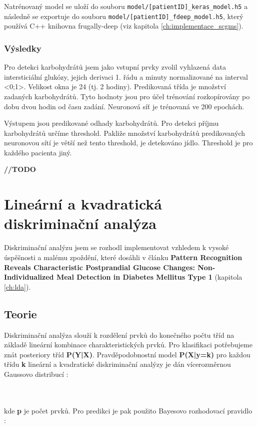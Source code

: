Natrénovaný model se uloží do souboru \texttt{model/[patientID]\_keras\_model.h5} a následně se exportuje do souboru \texttt{model/[patientID]\_fdeep\_model.h5}, který používá C++ knihovna frugally-deep (viz kapitola \ref{ch:implementace_scgms}).

\subsubsection{Výsledky}

Pro detekci karbohydrátů jsem jako vstupní prvky zvolil vyhlazená data intersticiální glukózy, jejich derivaci 1. řádu a minuty normalizované na interval <0;1>. Velikost okna je 24 (tj. 2 hodiny). Predikovaná třída je množství zadaných karbohydrátů. Tyto hodnoty jsou pro účel trénování rozkopírovány po dobu dvou hodin od času zadání. Neuronová síť je trénovaná ve 200 epochách.

Výstupem jsou predikované odhady karbohydrátů. Pro detekci příjmu karbohydrátů určíme threshold. Pakliže množství karbohydrátů predikovaných neuronovou sítí je větší než tento threshold, je detekováno jídlo. Threshold je pro každého pacienta jiný.

\textbf{//TODO}

\section{Lineární a kvadratická diskriminační analýza}
\label{ch:lda_qda}

Diskriminační analýzu jsem se rozhodl implementovat vzhledem k vysoké úspěšnosti a malému zpoždění, které dosáhli \citet{Analyza.LDA} v článku \textbf{Pattern Recognition Reveals Characteristic Postprandial Glucose Changes: Non-Individualized Meal Detection in Diabetes Mellitus Type 1} (kapitola \ref{ch:lda}).

\subsection{Teorie}
Diskriminační analýza slouží k rozdělení prvků do konečného počtu tříd na základě lineární kombinace charakteristických prvků. Pro klasifikaci potřebujeme znát posteriory tříd \textbf{P(Y|X)}. Pravděpodobnostní model \textbf{P(X|y=k)} pro každou třídu \textbf{k} lineární a kvadratické diskriminační analýzy je dán vícerozměrnou Gaussovo distribucí \citep{cho.book.lda}:

\\\\
kde \textbf{p} je počet prvků. Pro predikci je pak použito Bayesovo rozhodovací pravidlo \citep{cho.book.lda}:

